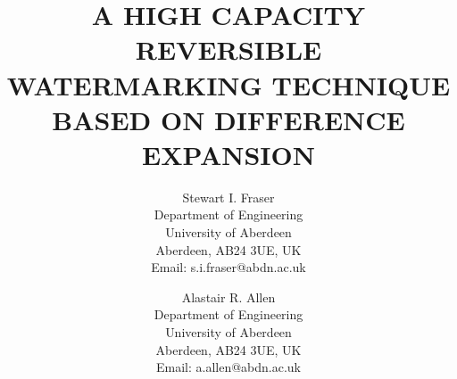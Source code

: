 \documentclass[10pt,twocolumn,letterpaper]{article}
\begin{document}
\date{}

\title{A HIGH CAPACITY REVERSIBLE WATERMARKING TECHNIQUE BASED ON DIFFERENCE EXPANSION}

\author{Stewart I. Fraser \\
        Department of Engineering \\
        University of Aberdeen \\
        Aberdeen, AB24 3UE, UK \\
        Email: s.i.fraser@abdn.ac.uk 
        \and
        Alastair R. Allen \\
        Department of Engineering \\
        University of Aberdeen \\
        Aberdeen, AB24 3UE, UK \\
        Email: a.allen@abdn.ac.uk
}

\addtolength{\parskip}{0.4cm}

\maketitle
\thispagestyle{empty}
\end{document}
